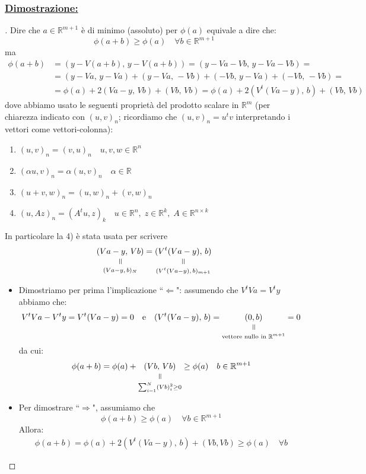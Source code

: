 \subsubsection{\uline{Dimostrazione:}}
\begin{proof}[\unskip\nopunct]
Dire che $a \in \mathbb{R}^{m+1}$ è di minimo (assoluto) per $\phi(a)$ equivale a dire che:
\[
	\phi(a+b) \geq \phi(a) \quad \forall b \in \mathbb{R}^{m+1}
\]
ma
\[ \begin{split}
\phi(a+b) & = (y-V(a+b),\, y-V(a+b)) = 
 (y-Va-Vb, \, y-Va-Vb) = \\
& = (y-Va,\, y-Va) + (y-Va, \, -Vb) + (-Vb, \, y-Va) + (-Vb, \, -Vb) = \\
& = \phi(a) + 2(Va-y, \, Vb) + (Vb, \, Vb) = \phi(a) +2(V^t(Va-y), \, b) + (Vb, \, Vb)
\end{split} \]
dove abbiamo usato le seguenti proprietà del prodotto scalare in $\mathbb{R}^{m}$ (per chiarezza indicato con $(u,v)_n$; ricordiamo che $(u,v)_n=u^tv$ interpretando i vettori come vettori-colonna):
\begin{enumerate}
\item $(u,v)_n=(v,u)_n \quad u,v,w \in \mathbb{R}^{n}$
\item $(\alpha u,v)_n= \alpha(u,v)_n \quad \alpha \in \mathbb{R}$
\item $(u+v,w)_n=(u,w)_n+(v,w)_n$
\item $(u,Az)_n = (A^tu,z)_k \quad u \in \mathbb{R}^{n}, \; z \in \mathbb{R}^{k}, \; A \in \mathbb{R}^{n \times k}$
\end{enumerate}
In particolare la 4) è stata usata per scrivere
\[
    \equalto{(Va-y, \, Vb)}{(Va-y, \, b)_N} = \equalto{(V^t(Va-y), \, b)}{(V^t(Va-y), \, b)_{m+1}}
\]
\begin{itemize}
\item Dimostriamo per prima l'implicazione ``$\Leftarrow$": assumendo che $V^t Va=V^t y$ abbiamo che:
\[
	V^tVa-V^ty=V^t(Va-y)=0 \quad \text{e} \quad (V^t(Va-y), \, b)=\equalto{(0,b)}{\text{vettore nullo in }\mathbb{R}^{m+1}} =0
\]
da cui:
\[ \begin{split}
	\phi(a+b)=\phi(a)+ \equalto{(Vb,\, Vb)}{\sum_{i=1}^{N}(Vb)_i^2 \geq 0} \geq \phi(a) \quad b \in \mathbb{R}^{m+1}
\end{split} \]
\item Per dimostrare ``$\Rightarrow$", assumiamo che
\[
	\phi(a+b) \geq \phi(a) \quad \forall b \in \mathbb{R}^{m+1}
\]
Allora:
\[ \begin{split}
	\phi(a+b)=\phi(a)+2(V^t(Va-y), \, b)+(Vb,Vb) \geq \phi(a) \quad \forall b

\end{split}\]
\end{itemize}
\end{proof}
